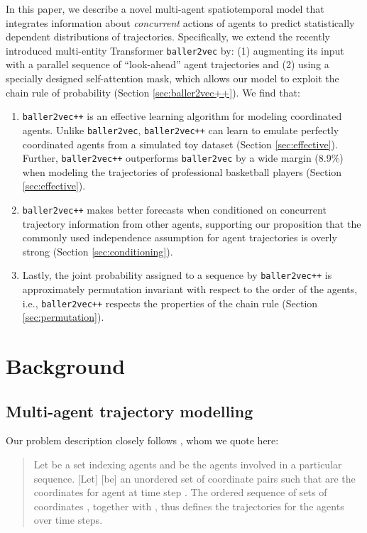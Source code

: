 \documentclass{article}
\newcommand{\btv}{\texttt{baller2vec}}
\newcommand{\btvpp}{\texttt{baller2vec++}}
\begin{document}
In this paper, we describe a novel multi-agent spatiotemporal model that integrates information about \textit{concurrent} actions of agents to predict statistically dependent distributions of trajectories.
Specifically, we extend the recently introduced multi-entity Transformer \btv{} \cite{alcorn2021baller2vec} by: (1) augmenting its input with a parallel sequence of ``look-ahead'' agent trajectories and (2) using a specially designed self-attention mask, which allows our model to exploit the chain rule of probability (Section \ref{sec:baller2vec++}).
We find that:

\begin{enumerate}
    \item \btvpp{} is an effective learning algorithm for modeling coordinated agents.
    Unlike \btv{}, \btvpp{} can learn to emulate perfectly coordinated agents from a simulated toy dataset (Section \ref{sec:effective}).
    Further, \btvpp{} outperforms \btv{} by a wide margin (8.9\%) when modeling the trajectories of professional basketball players (Section \ref{sec:effective}).
    \item \btvpp{} makes better forecasts when conditioned on concurrent trajectory information from other agents, supporting our proposition that the commonly used independence assumption for agent trajectories is overly strong (Section \ref{sec:conditioning}).
    \item Lastly, the joint probability assigned to a sequence by \btvpp{} is approximately permutation invariant with respect to the order of the agents, i.e., \btvpp{} respects the properties of the chain rule (Section \ref{sec:permutation}).
\end{enumerate} 
\section{Background}\label{sec:background}
\subsection{Multi-agent trajectory modelling}

Our problem description closely follows \citet{alcorn2021baller2vec}, whom we quote here:

\begin{quote}
Let  be a set indexing  agents and  be the  agents involved in a particular sequence.
[Let]  [be] an unordered set of  coordinate pairs such that  are the coordinates for agent  at time step .
The ordered sequence of sets of coordinates , together with , thus defines the trajectories for the  agents over  time steps.
\end{quote}
\end{document}
